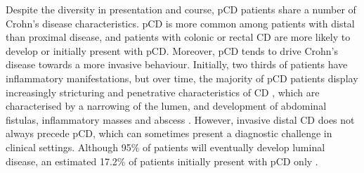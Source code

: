 Despite the diversity in presentation and course, pCD patients share a number of Crohn's disease characteristics. pCD is  more common among patients with distal than proximal disease, and patients with colonic or rectal CD are more likely to develop or initially present with pCD. Moreover, pCD tends to drive Crohn's disease towards a more invasive behaviour. Initially, two thirds of patients have inflammatory manifestations, but over time, the majority of pCD patients display increasingly stricturing and penetrative characteristics of CD \cite{Peyrin-Biroulet2010-mf,Scharl2017-sp}, which are characterised by a narrowing of the lumen, and development of abdominal fistulas, inflammatory masses and abscess \cite{Gasche2000-qh}.  However, invasive distal CD does not always precede pCD, which can sometimes present a diagnostic challenge in clinical settings. Although 95\% of patients will eventually develop luminal disease, an estimated 17.2\% of patients initially present with pCD only \cite{Eglinton2012-hh}. \\


